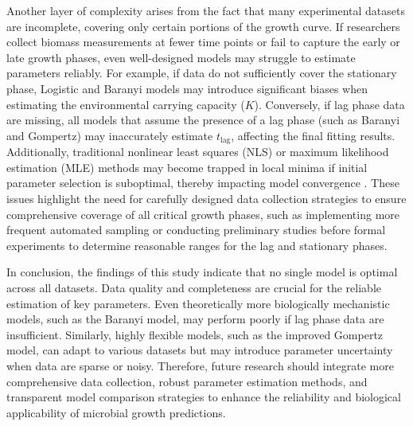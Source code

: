 \documentclass[12pt]{article}
\begin{document}
Another layer of complexity arises from the fact that many experimental datasets are incomplete, covering only certain portions of the growth curve. If researchers collect biomass measurements at fewer time points or fail to capture the early or late growth phases, even well-designed models may struggle to estimate parameters reliably. For example, if data do not sufficiently cover the stationary phase, Logistic and Baranyi models may introduce significant biases when estimating the environmental carrying capacity ($K$). Conversely, if lag phase data are missing, all models that assume the presence of a lag phase (such as Baranyi and Gompertz) may inaccurately estimate $t_{\text{lag}}$, affecting the final fitting results. Additionally, traditional nonlinear least squares (NLS) or maximum likelihood estimation (MLE) methods may become trapped in local minima if initial parameter selection is suboptimal, thereby impacting model convergence \citep{BurnhamAnderson2002}. These issues highlight the need for carefully designed data collection strategies to ensure comprehensive coverage of all critical growth phases, such as implementing more frequent automated sampling or conducting preliminary studies before formal experiments to determine reasonable ranges for the lag and stationary phases.

In conclusion, the findings of this study indicate that no single model is optimal across all datasets. Data quality and completeness are crucial for the reliable estimation of key parameters. Even theoretically more biologically mechanistic models, such as the Baranyi model, may perform poorly if lag phase data are insufficient. Similarly, highly flexible models, such as the improved Gompertz model, can adapt to various datasets but may introduce parameter uncertainty when data are sparse or noisy. Therefore, future research should integrate more comprehensive data collection, robust parameter estimation methods, and transparent model comparison strategies to enhance the reliability and biological applicability of microbial growth predictions.
\clearpage
 
   
\end{document}
